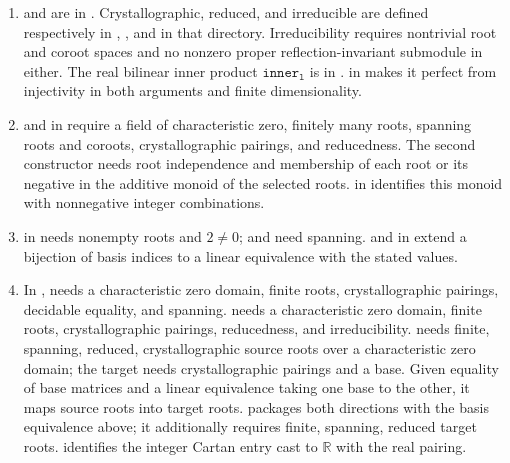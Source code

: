 \begin{enumerate}
 gives uniqueness of
paths in an acyclic graph. Connectedness supplies their existence.
The graph definitions are in ,
, and  under
.
\item {} and  are in
.
Crystallographic, reduced, and irreducible are defined respectively in
, , and 
in that directory. Irreducibility requires nontrivial root and coroot
spaces and no nonzero proper reflection-invariant submodule in either.
The real bilinear inner product $\texttt{inner}_{\mathtt l}$ is in
.
 in
 makes it perfect
from injectivity in both arguments and finite dimensionality.
\item {} and  in
 require a field
of characteristic zero, finitely many roots, spanning roots and coroots,
crystallographic pairings, and reducedness. The second constructor needs
root independence and membership of each root or its negative in the
additive monoid of the selected roots.
 in
 identifies this monoid with
nonnegative integer combinations.
\item {} in
 needs nonempty roots
and $2\ne0$;  and
 need spanning.
 and  in
 extend a bijection of basis
indices to a linear equivalence with the stated values.
\item In ,
 needs a characteristic
zero domain, finite roots, crystallographic pairings, decidable equality,
and spanning. 
needs a characteristic zero domain, finite roots, crystallographic
pairings, reducedness, and irreducibility.
 needs
finite, spanning, reduced, crystallographic source roots over a
characteristic zero domain; the target needs crystallographic pairings
and a base. Given equality of base matrices and a linear equivalence
taking one base to the other, it maps source roots into target roots.
 packages both directions
with the basis equivalence above; it additionally requires finite,
spanning, reduced target roots.
 identifies the
integer Cartan entry cast to $\mathbb R$ with the real pairing.
\end{enumerate}
